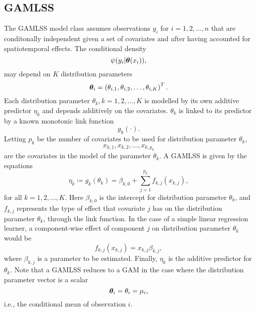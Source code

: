 \subsection{GAMLSS}
The GAMLSS model class assumes observations $y_i$ for $i=1,2,\ldots,n$ that are conditonally independent given a set of covariates and after having accounted for spatiotemporal effects.
The conditional density
\begin{equation}\label{gamlss-density}
    \psi(y_i|\boldsymbol{\theta}(x_i)),
\end{equation}
may depend on $K$ distribution parameters
\begin{equation*}
    \boldsymbol{\theta}_i=\left(\theta_{i,1},\theta_{i,2},\ldots,\theta_{i,K}\right)^T.
\end{equation*}
Each distribution parameter $\theta_k,k=1,2,\ldots,K$ is modelled by its own additive predictor $\eta_{k}$ and depends additively
on the covariates.
$\theta_k$ is linked to its predictor by a known monotonic link function
\begin{equation*}
    g_k(\cdot).
\end{equation*}
Letting $p_k$ be the number of covariates to be used for distribution parameter $\theta_k$,
\begin{equation*}
    x_{k,1},x_{k,2},\ldots,x_{k,p_k}
\end{equation*}
are the covariates in the model of the parameter $\theta_k$.
A GAMLSS is given by the equations
\begin{equation*}
    \eta_k\coloneqq g_k(\theta_k)=\beta_{k,0}+\sum_{j=1}^{p_k}f_{k,j}(x_{k,j}),
\end{equation*}
for all $k=1,2,\ldots,K$. Here $\beta_{k,0}$ is the intercept for distribution parameter $\theta_k$, and $f_{k,j}$ represents the type of effect that covariate $j$ has on the distribution parameter $\theta_k$, through the link function.
In the case of a simple linear regression learner, a component-wise effect of component $j$ on distribution parameter $\theta_k$ would be
\begin{equation*}
    f_{k,j}(x_{k,j})=x_{k,j}\beta_{k,j},
\end{equation*}
where $\beta_{k,j}$ is a parameter to be estimated.
Finally, $\eta_{k}$ is the additive predictor for $\theta_k$.
Note that a GAMLSS reduces to a GAM \citep{gam-book} in the case where the distribution parameter vector is a scalar
\begin{equation*}
    \boldsymbol{\theta}_i=\theta_i=\mu_i,
\end{equation*}
i.e., the conditional mean of observation $i$.
